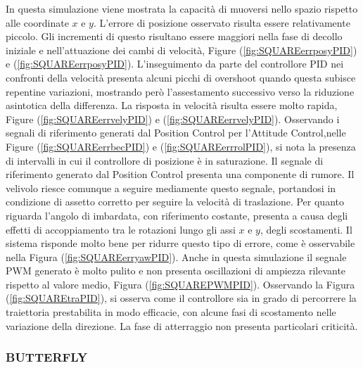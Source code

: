 In questa simulazione viene mostrata la capacità di muoversi nello spazio rispetto alle coordinate $x$ e $y$. L'errore di posizione osservato risulta essere relativamente piccolo. Gli incrementi di questo risultano essere maggiori nella fase di decollo iniziale e nell'attuazione dei cambi di velocità, Figure (\ref{fig:SQUAREerrposyPID}) e (\ref{fig:SQUAREerrposyPID}). L'inseguimento da parte del controllore PID nei confronti della velocità presenta alcuni picchi di overshoot quando questa subisce repentine variazioni, mostrando però l'assestamento successivo verso la riduzione asintotica della differenza. La risposta in velocità risulta essere molto rapida, Figure (\ref{fig:SQUAREerrvelyPID}) e (\ref{fig:SQUAREerrvelyPID}). Osservando i segnali di riferimento generati dal Position Control per l'Attitude Control,nelle Figure (\ref{fig:SQUAREerrbecPID}) e (\ref{fig:SQUAREerrrolPID}), si nota la presenza di intervalli in cui il controllore di posizione è in saturazione. Il segnale di riferimento generato dal Position Control presenta una componente di rumore. Il velivolo riesce comunque a seguire mediamente questo segnale, portandosi in condizione di assetto corretto per seguire la velocità di traslazione. Per quanto riguarda l'angolo di imbardata, con riferimento costante, presenta a causa degli effetti di accoppiamento tra le rotazioni lungo gli assi $x$ e $y$, degli scostamenti. Il sistema risponde molto bene per ridurre questo tipo di errore, come è osservabile nella Figura (\ref{fig:SQUAREerryawPID}). Anche in questa simulazione il segnale PWM generato è molto pulito e non presenta oscillazioni di ampiezza rilevante rispetto al valore medio, Figura (\ref{fig:SQUAREPWMPID}). Osservando la Figura (\ref{fig:SQUAREtraPID}), si osserva come il controllore sia in grado di percorrere la traiettoria prestabilita in modo efficacie, con alcune fasi di scostamento nelle variazione della direzione. La fase di atterraggio non presenta particolari criticità.


\subsubsection{BUTTERFLY}

